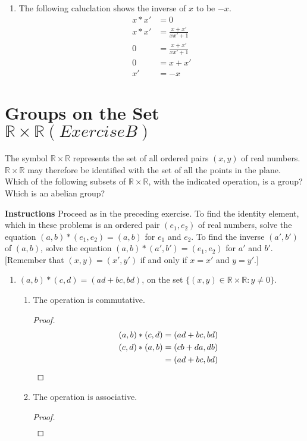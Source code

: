 \documentclass[draft,twoside]{amsart}
\newcommand{\Reals}{\mathbb{R}{}}
\begin{document}
\begin{enumerate}
\begin{enumerate}
	 \item The following caluclation shows the inverse of $x$ to be
	 $-x$.
	 \begin{align*}
	    x * x' & = 0                      \\
	    x * x' & = \frac{x + x'}{xx' + 1} \\
	        0  & = \frac{x + x'}{xx' + 1} \\
		0  & = x + x' \\
	        x' & = -x
	 \end{align*}
      \end{enumerate}
\end{enumerate}

\section{Groups on the Set $\Reals \times \Reals (Exercise B)$}

The symbol $\Reals \times \Reals$ represents the set of all ordered pairs
$(x,y)$ of real numbers.  $\Reals \times \Reals$ may therefore be identified
with the set of all the points in the plane.  Which of the following subsets of
$\Reals \times \Reals$, with the indicated operation, is a group?  Which is an
abelian group?

\textbf{Instructions} Proceed as in the preceding exercise. To find the
identity element, which in these problems is an ordered pair $(e_1, e_2)$ of
real numbers, solve the equation $(a,b) * (e_1, e_2) = (a,b)$ for $e_1$ and
$e_2$. To find the inverse $(a',b')$ of $(a,b)$, solve the equation
$(a,b)*(a',b')=(e_1,e_2)$ for $a'$ and $b'$. [Remember that $(x,y)=(x',y')$ if
and only if $x=x'$ and $y=y'$.]

   \begin{enumerate}
      \item $(a,b)*(c,d)=(ad+bc,bd)$, on the set $\{(x,y) \in \Reals
      \times \Reals : y \ne 0\}$.
      \begin{enumerate}
         \item The operation is commutative.
	 \begin{proof}
	    \begin{align*}
	       (a,b)*(c,d) & = (ad+bc,bd) \\
	       (c,d)*(a,b) & = (cb+da,db) \\
	                   & = (ad+bc,bd) \qedhere
	    \end{align*}
	 \end{proof}

	 \item The operation is associative.
	 \begin{proof}
	    \begin{align*}
	    \end{align*}
	 \end{proof}
      \end{enumerate}
   \end{enumerate}
\end{document}

